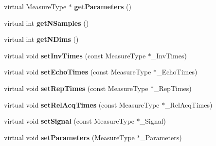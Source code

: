 \begin{DoxyCompactItemize}
\item 
\hypertarget{class_ox_1_1_functions_t1_ae135536ab79b836d77286fec0efdc6c8}{virtual Measure\-Type $\ast$ {\bfseries get\-Parameters} ()}\label{class_ox_1_1_functions_t1_ae135536ab79b836d77286fec0efdc6c8}

\item 
\hypertarget{class_ox_1_1_functions_t1_a70e137063cc2e6ef086046e596af4a15}{virtual int {\bfseries get\-N\-Samples} ()}\label{class_ox_1_1_functions_t1_a70e137063cc2e6ef086046e596af4a15}

\item 
\hypertarget{class_ox_1_1_functions_t1_a4bd8c56786631568dac07ddae165a6b1}{virtual int {\bfseries get\-N\-Dims} ()}\label{class_ox_1_1_functions_t1_a4bd8c56786631568dac07ddae165a6b1}

\item 
\hypertarget{class_ox_1_1_functions_t1_a5a96e27da44213d1b4f4a7e91d8e0347}{virtual void {\bfseries set\-Inv\-Times} (const Measure\-Type $\ast$\-\_\-\-Inv\-Times)}\label{class_ox_1_1_functions_t1_a5a96e27da44213d1b4f4a7e91d8e0347}

\item 
\hypertarget{class_ox_1_1_functions_t1_a3ce890151e04cf3c9649c1e8bed3dcb1}{virtual void {\bfseries set\-Echo\-Times} (const Measure\-Type $\ast$\-\_\-\-Echo\-Times)}\label{class_ox_1_1_functions_t1_a3ce890151e04cf3c9649c1e8bed3dcb1}

\item 
\hypertarget{class_ox_1_1_functions_t1_ad221400dbedf2ac324f0e80105a261fb}{virtual void {\bfseries set\-Rep\-Times} (const Measure\-Type $\ast$\-\_\-\-Rep\-Times)}\label{class_ox_1_1_functions_t1_ad221400dbedf2ac324f0e80105a261fb}

\item 
\hypertarget{class_ox_1_1_functions_t1_a278e7e3d4989fb9305cdc0ec6160f1a8}{virtual void {\bfseries set\-Rel\-Acq\-Times} (const Measure\-Type $\ast$\-\_\-\-Rel\-Acq\-Times)}\label{class_ox_1_1_functions_t1_a278e7e3d4989fb9305cdc0ec6160f1a8}

\item 
\hypertarget{class_ox_1_1_functions_t1_a73bd06989de4d204d8e654c583cd3ce3}{virtual void {\bfseries set\-Signal} (const Measure\-Type $\ast$\-\_\-\-Signal)}\label{class_ox_1_1_functions_t1_a73bd06989de4d204d8e654c583cd3ce3}

\item 
\hypertarget{class_ox_1_1_functions_t1_a27bdccbcb4aa30b945453a33b25fdbf7}{virtual void {\bfseries set\-Parameters} (Measure\-Type $\ast$\-\_\-\-Parameters)}\label{class_ox_1_1_functions_t1_a27bdccbcb4aa30b945453a33b25fdbf7}


\end{DoxyCompactItemize}
